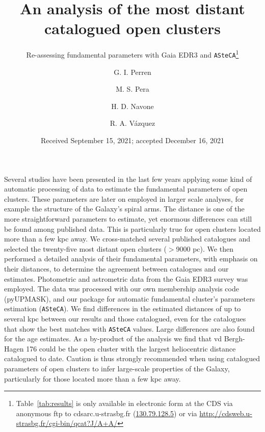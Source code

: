 \documentclass{aa}
\begin{document}
 


\title{An analysis of the most distant catalogued open clusters}
\subtitle{Re-assessing fundamental parameters with Gaia EDR3 and
\texttt{ASteCA}\thanks{
Table~\ref{tab:results} is only available in electronic form
at the CDS via anonymous ftp to cdsarc.u-strasbg.fr (\url{130.79.128.5})
or via \url{http://cdsweb.u-strasbg.fr/cgi-bin/qcat?J/A+A/}}}

\author{G. I. Perren
      \and
      M. S. Pera
      \and
      H. D. Navone
      \and
      R. A. Vázquez
}

\date{Received September 15, 2021; accepted December 16, 2021}

 
\abstract
{Several studies have been presented in the last few years applying some kind of
automatic processing of data to estimate the fundamental parameters of open
clusters. These parameters are later on employed in larger scale analyses, for
example the structure of the Galaxy's spiral arms.
The distance is one of the more straightforward parameters to estimate, yet
enormous differences can still be found among published data. This is
particularly true for open clusters located more than a few kpc away.}
{
We cross-matched several published catalogues and selected the twenty-five most
distant open clusters ($>$9000 pc). We then performed a detailed analysis of
their fundamental parameters, with emphasis on their distances, to determine the
agreement between catalogues and our estimates.}
{Photometric and astrometric data from the Gaia EDR3 survey was employed. The
data was processed with our own membership analysis code (pyUPMASK), and our
package for automatic fundamental cluster's parameters estimation
(\texttt{ASteCA}).}
{We find differences in the estimated distances of up to several kpc
between our results and those catalogued, even for the catalogues that show the
best matches with \texttt{ASteCA} values. Large differences are also found for
the age estimates. As a by-product of the analysis we find that
vd Bergh-Hagen 176 could be the open cluster with the largest heliocentric
distance catalogued to date.}
{Caution is thus strongly recommended when using catalogued parameters of open
clusters to infer large-scale properties of the Galaxy, particularly for those
located more than a few kpc away.}
\end{document}
